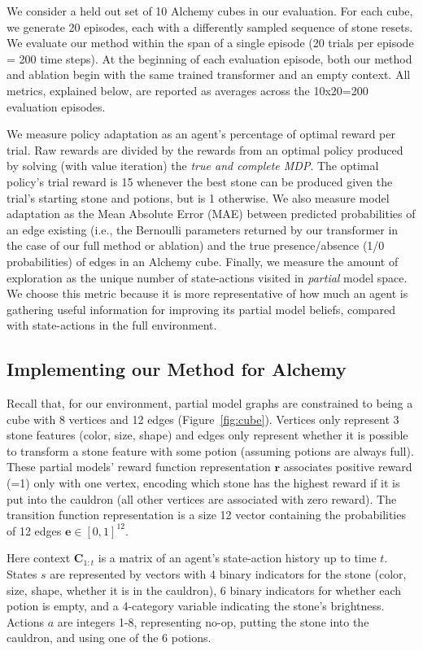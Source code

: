 \documentclass[sigconf]{aamas}
\begin{document}
We consider a held out set of 10 Alchemy cubes in our evaluation. For each cube, we generate 20 episodes, each with a differently sampled sequence of stone resets. We evaluate our method within the span of a single episode (20 trials per episode = 200 time steps). At the beginning of each evaluation episode, both our method and ablation begin with the same trained transformer and an empty context. All metrics, explained below, are reported as averages across the 10x20=200 evaluation episodes.

We measure policy adaptation as an agent's percentage of optimal reward per trial. Raw rewards are divided by the rewards from an optimal policy produced by solving (with value iteration) the \textit{true and complete MDP}. The optimal policy's trial reward is 15 whenever the best stone can be produced given the trial's starting stone and potions, but is 1 otherwise. We also measure model adaptation as the Mean Absolute Error (MAE) between predicted probabilities of an edge existing (i.e., the Bernoulli parameters returned by our transformer in the case of our full method or ablation) and the true presence/absence (1/0 probabilities) of edges in an Alchemy cube. Finally, we measure the amount of exploration as the unique number of state-actions visited in \textit{partial} model space. We choose this metric because it is more representative of how much an agent is gathering useful information for improving its partial model beliefs, compared with state-actions in the full environment.

\subsection{Implementing our Method for Alchemy}\label{sec:impl-method}
Recall that, for our environment, partial model graphs are constrained to being a cube with 8 vertices and 12 edges (Figure~\ref{fig:cube}). Vertices only represent 3 stone features (color, size, shape) and edges only represent whether it is possible to transform a stone feature with some potion (assuming potions are always full). These partial models' reward function representation $\mathbf{r}$ associates positive reward (=1) only with one vertex, encoding which stone has the highest reward if it is put into the cauldron (all other vertices are associated with zero reward). The transition function representation is a size 12 vector containing the probabilities of 12 edges $\mathbf{e} \in [0, 1]^{12}$.

Here context $\mathbf{C}_{1:t}$ is a matrix of an agent's state-action history up to time $t$. States $s$ are represented by vectors with 4 binary indicators for the stone (color, size, shape, whether it is in the cauldron), 6 binary indicators for whether each potion is empty, and a 4-category variable indicating the stone's brightness. Actions $a$ are integers 1-8, representing no-op, putting the stone into the cauldron, and using one of the 6 potions.
\end{document}
